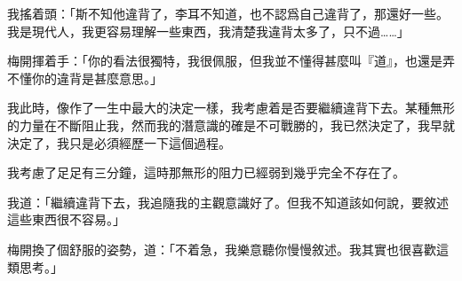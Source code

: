 我搖着頭：「斯不知他違背了，李耳不知道，也不認爲自己違背了，那還好一些。我是現代人，我更容易理解一些東西，我清楚我違背太多了，只不過……」

梅開揮着手：「你的看法很獨特，我很佩服，但我並不懂得甚麼叫『道』，也還是弄不懂你的違背是甚麼意思。」

我此時，像作了一生中最大的決定一樣，我考慮着是否要繼續違背下去。某種無形的力量在不斷阻止我，然而我的潛意識的確是不可戰勝的，我已然決定了，我早就決定了，我只是必須經歷一下這個過程。

我考慮了足足有三分鐘，這時那無形的阻力已經弱到幾乎完全不存在了。

我道：「繼續違背下去，我追隨我的主觀意識好了。但我不知道該如何說，要敘述這些東西很不容易。」

梅開換了個舒服的姿勢，道：「不着急，我樂意聽你慢慢敘述。我其實也很喜歡這類思考。」

